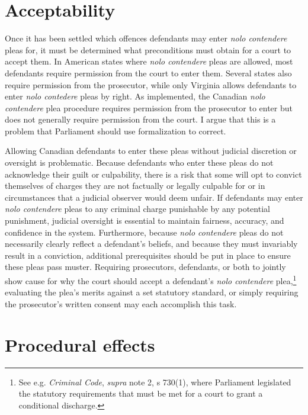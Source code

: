 \section{Acceptability}

Once it has been settled which offences defendants may enter \textit{nolo contendere} pleas for, it must be determined what preconditions must obtain for a court to accept them. In American states where \textit{nolo contendere} pleas are allowed, most defendants require permission from the court to enter them. Several states also require permission from the prosecutor, while only Virginia allows defendants to enter \textit{nolo contedere} pleas by right. As implemented, the Canadian \textit{nolo contendere} plea procedure requires permission from the prosecutor to enter but does not generally require permission from the court. I argue that this is a problem that Parliament should use formalization to correct.

Allowing Canadian defendants to enter these pleas without judicial discretion or oversight is problematic. Because defendants who enter these pleas do not acknowledge their guilt or culpability, there is a risk that some will opt to convict themselves of charges they are not factually or legally culpable for or in circumstances that a judicial observer would deem unfair. If defendants may enter \textit{nolo contendere} pleas to any criminal charge punishable by any potential punishment, judicial oversight is essential to maintain fairness, accuracy, and confidence in the system. Furthermore, because \textit{nolo contendere} pleas do not necessarily clearly reflect a defendant's beliefs, and because they must invariably result in a conviction, additional prerequisites should be put in place to ensure these pleas pass muster. Requiring prosecutors, defendants, or both to jointly show cause for why the court should accept a defendant's \textit{nolo contendere} plea,\footnote{See e.g. \textit{Criminal Code}, \textit{supra} note 2, s 730(1), where Parliament legislated the statutory requirements that must be met for a court to grant a conditional discharge.} evaluating the plea's merits against a set statutory standard, or simply requiring the prosecutor's written consent may each accomplish this task. 

\section{Procedural effects}

